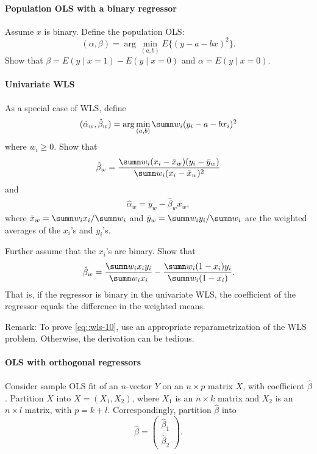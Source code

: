 \paragraph{Population OLS with a binary regressor}\label{problem::pols-binary}


Assume $x$ is binary. Define the population OLS: 
$$
(\alpha, \beta)  = \arg\min_{(a,b)} E \{  (y - a - bx)^2 \} .
$$
Show that $\beta = E(y\mid x=1) - E(y\mid x=0)$ and $\alpha = E(y\mid x=0)$. 


\paragraph{Univariate WLS}\label{hw::wls-uni-binary}

As a special case of WLS, define 
$$
(\hat \alpha_w, \hat \beta_w  ) = \arg\min_{(a,b)} \sumn w_i(y_i - a - b x_i)^2
$$
where $w_i\geq 0$. Show that
\begin{eqnarray}\label{eq::wls-beta}
 \hat \beta_w  = \frac{  \sumn w_i (x_i -  \bar{x}_w) (y_i - \bar{y}_w) }{  \sumn w_i (x_i - \bar{x}_w)^2 }
\end{eqnarray}
and 
\begin{eqnarray}\label{eq::wls-alpha}
\hat \alpha_w = \bar{y}_w -  \hat \beta_w \bar{x}_w,
\end{eqnarray}
where $ \bar{x}_w =  \sumn w_i  x_i / \sumn w_i $ and $ \bar{y}_w =  \sumn w_i  y_i / \sumn w_i $ are the weighted averages of the $x_i$'s and $y_i$'s. 



Further assume that the $x_i$'s are binary. Show that  
\begin{eqnarray}\label{eq::wls-10}
\hat \beta_w  = \frac{ \sumn  w_i  x_i  y_i  }{ \sumn w_i  x_i  } - \frac{ \sumn w_i  (1-x_i)  y_i  }{ \sumn w_i  (1-x_i)  }.
\end{eqnarray}
That is, if the regressor is binary in the univariate WLS, the coefficient of the regressor equals the difference in the weighted means. 


Remark: To prove \eqref{eq::wls-10}, use an appropriate reparametrization of the WLS problem. Otherwise, the derivation can be tedious. 




\paragraph{OLS with orthogonal regressors}\label{hw::ols-orthogonal}


Consider sample OLS fit of an $n$-vector $Y$ on an $n\times p$ matrix $X $, with coefficient $\hat{\beta}$. Partition $X$ into $X = (X_1, X_2)$, where $X_1$ is an $n\times k$ matrix and $X_2$ is an $n\times l$ matrix, with $p=k+l$. Correspondingly, partition $\hat{\beta}$ into 
$$
\hat{\beta} = \begin{pmatrix}
\hat{\beta}_1\\
\hat{\beta}_2
\end{pmatrix} . 
$$


